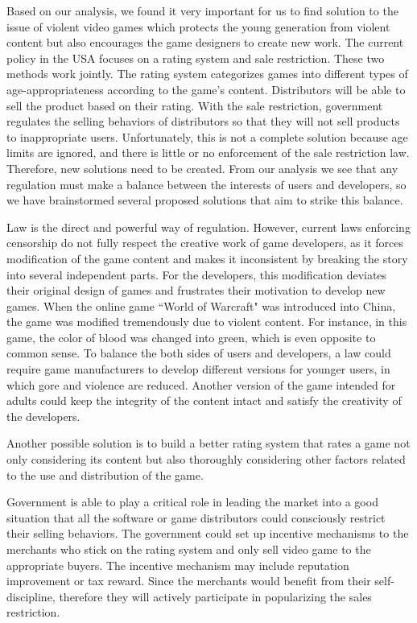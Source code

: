 \indent\indent Based on our analysis, we found it very important for us to find solution to the issue of violent video games which protects the young generation from violent content but also encourages the game designers to create new work. The current policy in the USA focuses on a rating system and sale restriction. These two methods work jointly. The rating system categorizes games into different types of age-appropriateness according to the game's content. Distributors will be able to sell the product based on their rating. With the sale restriction, government regulates the selling behaviors of distributors so that they will not sell products to inappropriate users. Unfortunately, this is not a complete solution because age limits are ignored, and there is little or no enforcement of the sale restriction law. Therefore, new solutions need to be created. From our analysis we see that any regulation must make a balance between the interests of users and developers, so we have brainstormed several proposed solutions that aim to strike this balance. 

Law is the direct and powerful way of regulation. However, current laws enforcing censorship do not fully respect the creative work of game developers, as it forces modification of the game content and makes it inconsistent by breaking the story into several independent parts. For the developers, this modification deviates their original design of games and frustrates their motivation to develop new games. When the online game ``World of Warcraft" was introduced into China, the game was modified tremendously due to violent content. For instance, in this game, the color of blood was changed into green, which is even opposite to common sense. To balance the both sides of users and developers, a law could require game manufacturers to develop different versions for younger users, in which gore and violence are reduced. Another version of the game intended for adults could keep the integrity of the content intact and satisfy the creativity of the developers. 

Another possible solution is to build a better rating system that rates a game not only considering its content but also thoroughly considering other factors related to the use and distribution of the game. 

Government is able to play a critical role in leading the market into a good situation that all the software or game distributors could consciously restrict their selling behaviors. The government could set up incentive mechanisms to the merchants who stick on the rating system and only sell video game to the appropriate buyers. The incentive mechanism may include reputation improvement or tax reward. Since the merchants would benefit from their self-discipline, therefore they will actively participate in popularizing the sales restriction.

